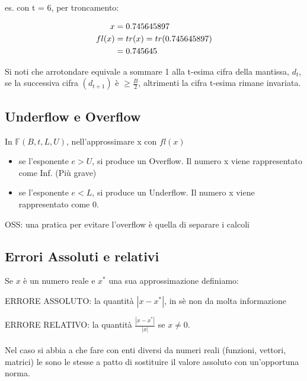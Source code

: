 \documentclass[a4paper, 11pt]{article}
\begin{document}
        es. con t = 6, per troncamento: 



        \begin{align}
            x &= 0.745645897 \notag \\
            fl(x) &= tr(x) = tr(0.745645897) \notag \\
            &= 0.745645 \notag
        \end{align}



        Si noti che arrotondare equivale a sommare 1 alla t-esima cifra della mantissa, $d_{t}$, se la successiva cifra $(d_{t+1})$ è $\geq \frac{B}{2}$, altrimenti la cifra t-esima rimane invariata.

        \subsection{Underflow e Overflow}

        In $\mathbb{F}(B,t,L,U)$, nell’approssimare x con $fl(x)$ 

        \begin{itemize}
            \item se l’esponente $e > U$, si produce un Overflow. Il numero x viene
            rappresentato come Inf. (Più grave)
            \item se l’esponente $e < L$, si produce un Underflow. Il numero x viene
            rappresentato come 0.
        \end{itemize}

        OSS: una pratica per evitare l'overflow è quella di separare i calcoli

        \subsection{Errori Assoluti e relativi}

        Se $x$ è un numero reale e $x^*$ una sua approssimazione definiamo:

        ERRORE ASSOLUTO: la quantità $|x-x^*|$, in sè non da molta informazione

        ERRORE RELATIVO: la quantità $\frac{|x-x^*|}{|x|}$
        se $x\neq 0 $.

        \paragraph{}
        Nel caso si abbia a che fare con enti diversi da numeri reali (funzioni, vettori, matrici) le sono le stesse a patto di sostituire il valore assoluto con un’opportuna norma.
\end{document}
